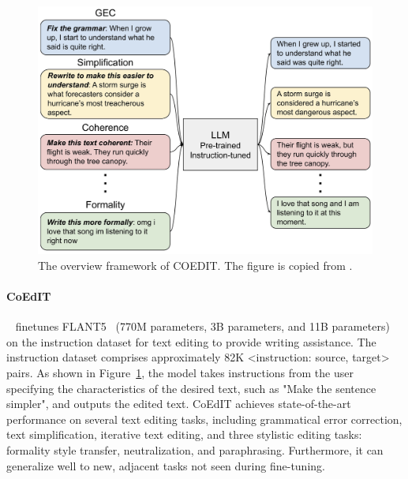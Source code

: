 \documentclass[11pt]{article}
\begin{document}
\begin{figure}[t]
  \centering
  \begin{minipage}[t]{0.5\textwidth}
    \centering
    \includegraphics[width=1\textwidth]{figures/COEDIT.jpg}
  \end{minipage}%
  \caption{The overview framework of COEDIT. The figure is copied from \citet{Raheja2023CoEdITTE}.}
  \label{fig:COEDIT}
\end{figure}

\paragraph{CoEdIT}~\citep{Raheja2023CoEdITTE} finetunes FLANT5~\citep{Chung2022ScalingIL} (770M parameters, 3B parameters, and 11B parameters) on the instruction dataset for text editing to provide writing assistance. The instruction dataset comprises approximately 82K <instruction: source, target> pairs. As shown in Figure~\ref{fig:COEDIT}, the model takes instructions from the user specifying the characteristics of the desired text, such as "Make the sentence simpler", and outputs the edited text. CoEdIT achieves state-of-the-art performance on several text editing tasks, including grammatical error correction, text simplification, iterative text editing, and three stylistic editing tasks: formality style transfer, neutralization, and paraphrasing. Furthermore, it can generalize well to new, adjacent tasks not seen during fine-tuning.
\end{document}
